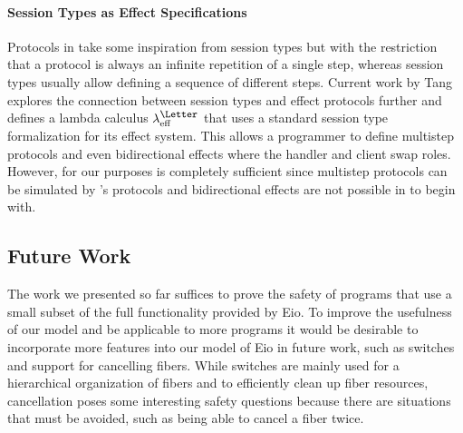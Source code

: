 \paragraph*{Session Types as Effect Specifications}
Protocols in \hazel{} take some inspiration from session types but with the restriction that a protocol is always an infinite repetition of a single step, whereas session types usually allow defining a sequence of different steps.
Current work by Tang~\cite{tangeff} explores the connection between session types and effect protocols further and defines a lambda calculus \(\lambda^{\mbox{{\footnotesize \Letter}}}_{\mathrm{eff}}\) that uses a standard session type formalization
for its effect system.
This allows a programmer to define multistep protocols and even bidirectional effects where the handler and client swap roles.
However, for our purposes \hazel{} is completely sufficient since multistep protocols can be simulated by \hazel{}'s protocols and bidirectional effects are not possible in \ocf{} to begin with.



\subsection{Future Work}
The work we presented so far suffices to prove the safety of programs that use a small subset of the full functionality provided by Eio.
To improve the usefulness of our model and be applicable to more programs it would be desirable to incorporate more features into our model of Eio in future work, such as switches and support for cancelling fibers.
While switches are mainly used for a hierarchical organization of fibers and to efficiently clean up fiber resources, cancellation poses some interesting safety questions because there are situations that must be avoided, such as being able to cancel a fiber twice.

